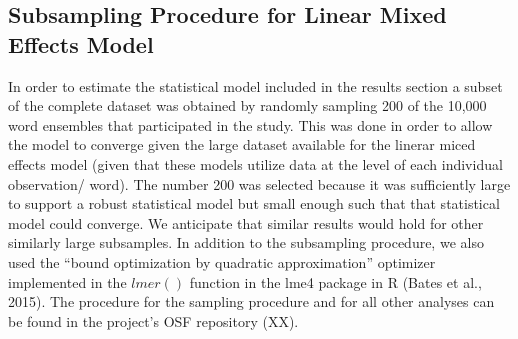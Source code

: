 \documentclass[
  ,man,floatsintext]{apa6}
\begin{document}
\subsection{Subsampling Procedure for Linear Mixed Effects Model}\label{subsampling-procedure-for-linear-mixed-effects-model}

In order to estimate the statistical model included in the results section a subset of the complete dataset was obtained by randomly sampling 200 of the 10,000 word ensembles that participated in the study. This was done in order to allow the model to converge given the large dataset available for the linerar miced effects model (given that these models utilize data at the level of each individual observation/ word). The number 200 was selected because it was sufficiently large to support a robust statistical model but small enough such that that statistical model could converge. We anticipate that similar results would hold for other similarly large subsamples. In addition to the subsampling procedure, we also used the ``bound optimization by quadratic approximation'' optimizer implemented in the \(lmer()\) function in the lme4 package in R (Bates et al., 2015). The procedure for the sampling procedure and for all other analyses can be found in the project's OSF repository (XX).


\clearpage
\renewcommand{\listtablename}{Table captions}
\end{document}
